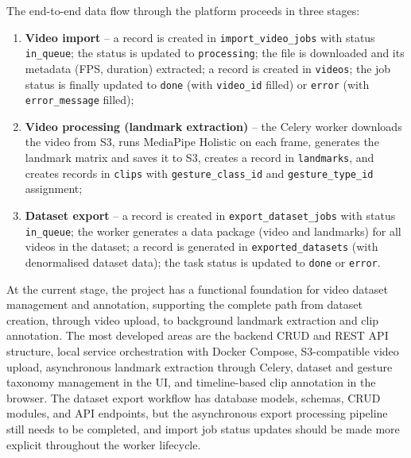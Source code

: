The end-to-end data flow through the platform proceeds in three stages:

\begin{enumerate}
  \item \textbf{Video import} -- a record is created in
        \texttt{import\_video\_jobs} with status \texttt{in\_queue}; the status
        is updated to \texttt{processing}; the file is downloaded and its
        metadata (FPS, duration) extracted; a record is created in
        \texttt{videos}; the job status is finally updated to \texttt{done}
        (with \texttt{video\_id} filled) or \texttt{error} (with
        \texttt{error\_message} filled);
  \item \textbf{Video processing (landmark extraction)} -- the Celery worker
        downloads the video from S3, runs MediaPipe Holistic on each frame,
        generates the landmark matrix and saves it to S3, creates a record in
        \texttt{landmarks}, and creates records in \texttt{clips} with
        \texttt{gesture\_class\_id} and \texttt{gesture\_type\_id} assignment;
  \item \textbf{Dataset export} -- a record is created in
        \texttt{export\_dataset\_jobs} with status \texttt{in\_queue}; the
        worker generates a data package (video and landmarks) for all videos in
        the dataset; a record is generated in \texttt{exported\_datasets} (with
        denormalised dataset data); the task status is updated to \texttt{done}
        or \texttt{error}.
\end{enumerate}

At the current stage, the project has a functional foundation for video dataset
management and annotation, supporting the complete path from dataset creation,
through video upload, to background landmark extraction and clip annotation.
The most developed areas are the backend CRUD and REST API structure, local
service orchestration with Docker Compose, S3-compatible video upload,
asynchronous landmark extraction through Celery, dataset and gesture taxonomy
management in the UI, and timeline-based clip annotation in the browser. The
dataset export workflow has database models, schemas, CRUD modules, and API
endpoints, but the asynchronous export processing pipeline still needs to be
completed, and import job status updates should be made more explicit throughout
the worker lifecycle.

